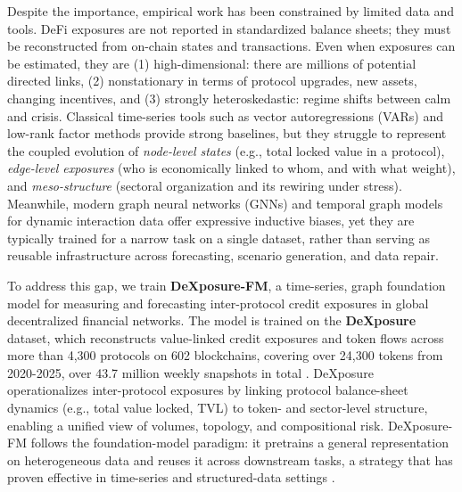 \documentclass[preprint,12pt]{elsarticle}
\begin{document}
Despite the importance, empirical work has been constrained by limited data and tools. DeFi exposures are not reported in standardized balance sheets; they must be reconstructed from on-chain states and transactions. Even when exposures can be estimated, they are (1) high-dimensional: there are millions of potential directed links, (2) nonstationary in terms of protocol upgrades, new assets, changing incentives, and (3) strongly heteroskedastic: regime shifts between calm and crisis. Classical time-series tools such as vector autoregressions (VARs) \citep{Sims1980} and low-rank factor methods \citep{StockWatson2002} provide strong baselines, but they struggle to represent the coupled evolution of \emph{node-level states} (e.g., total locked value in a protocol), \emph{edge-level exposures} (who is economically linked to whom, and with what weight), and \emph{meso-structure} (sectoral organization and its rewiring under stress). Meanwhile, modern graph neural networks (GNNs) \citep{KipfWelling2017,VelickovicEtAl2018} and temporal graph models for dynamic interaction data \citep{RossiEtAl2020TGN} offer expressive inductive biases, yet they are typically trained for a narrow task on a single dataset, rather than serving as reusable infrastructure across forecasting, scenario generation, and data repair.

To address this gap, we train \textbf{DeXposure-FM}, a time-series, graph foundation model for measuring and forecasting inter-protocol credit exposures in global decentralized financial networks. The model is trained on the \textbf{DeXposure} dataset, which reconstructs value-linked credit exposures and token flows across more than 4,300 protocols on 602 blockchains, covering over 24,300 tokens from 2020-2025, over 43.7 million weekly snapshots in total \cite{wu2025}. DeXposure operationalizes inter-protocol exposures by linking protocol balance-sheet dynamics (e.g., total value locked, TVL) to token- and sector-level structure, enabling a unified view of volumes, topology, and compositional risk. DeXposure-FM follows the foundation-model paradigm: it pretrains a general representation on heterogeneous data and reuses it across downstream tasks, a strategy that has proven effective in time-series and structured-data settings \cite{liang2024fmts,eremeev2025g2tfm}. 
\end{document}
